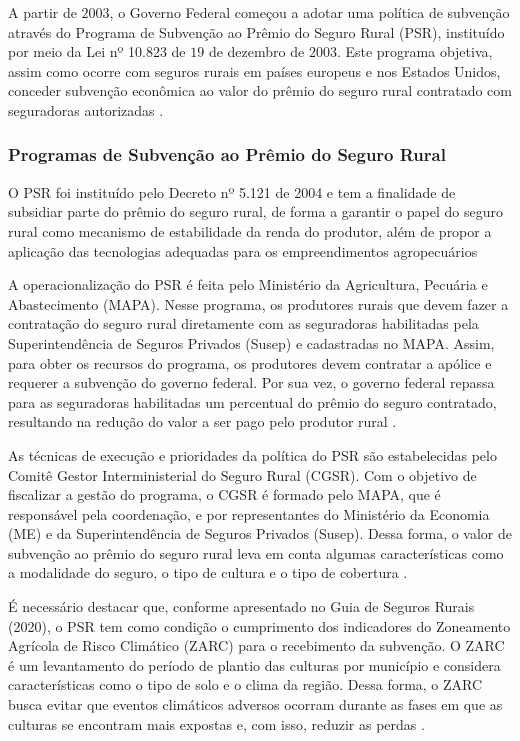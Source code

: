 \documentclass[
	12pt,				%
	openright,			%
	oneside,			%
	a4paper,			%
	chapter=TITLE,		%
	section=TITLE,		%
	english,			%
	french,				%
	spanish,			%
	brazil				%
	]{abntex2}
\begin{document}
A partir de $2003$, o Governo Federal começou a adotar uma política de subvenção através do Programa de Subvenção ao Prêmio do Seguro Rural (PSR), instituído por meio da Lei nº 10.823 de $19$ de dezembro de $2003$. Este programa objetiva, assim como ocorre com seguros rurais em países europeus e nos Estados Unidos, conceder subvenção econômica ao valor do prêmio do seguro rural contratado com seguradoras autorizadas \cite{maia11, silva14}.

\subsubsection{Programas de Subvenção ao Prêmio do Seguro Rural}

O PSR foi instituído pelo Decreto nº 5.121 de 2004 e tem a finalidade de subsidiar parte do prêmio do seguro rural, de forma a garantir o papel do seguro rural como mecanismo de estabilidade da renda do produtor, além de propor a aplicação das tecnologias adequadas para os empreendimentos agropecuários \cite{guia20}

A operacionalização do PSR é feita pelo Ministério da Agricultura, Pecuária e Abastecimento (MAPA). Nesse programa, os produtores rurais que devem fazer a contratação do seguro rural diretamente com as seguradoras habilitadas pela Superintendência de Seguros Privados (Susep) e cadastradas no MAPA. Assim, para obter os recursos do programa, os produtores devem contratar a apólice e requerer a subvenção do governo federal. Por sua vez, o governo federal repassa para as seguradoras habilitadas um percentual do prêmio do seguro contratado, resultando na redução do valor a ser pago pelo produtor rural \cite{silva14}.

As técnicas de execução e prioridades da política do PSR são estabelecidas pelo Comitê Gestor Interministerial do Seguro Rural (CGSR). Com o objetivo de fiscalizar a gestão do programa, o CGSR é formado pelo MAPA, que é responsável pela coordenação, e por representantes do Ministério da Economia (ME) e da Superintendência de Seguros Privados (Susep). Dessa forma, o valor de subvenção ao prêmio do seguro rural leva em conta algumas características como a modalidade do seguro, o tipo de cultura e o tipo de cobertura \cite{brasil21}.

É necessário destacar que, conforme apresentado no Guia de Seguros Rurais (2020), o PSR tem como condição o cumprimento dos indicadores do Zoneamento Agrícola de Risco Climático (ZARC) para o recebimento da subvenção. O ZARC  é um levantamento do período de plantio das culturas por município e considera características como o tipo de solo e o clima da região. Dessa forma, o ZARC busca evitar que eventos climáticos adversos ocorram durante as fases em que as culturas se encontram mais expostas e, com isso, reduzir as perdas \cite{guia20}.
\end{document}
